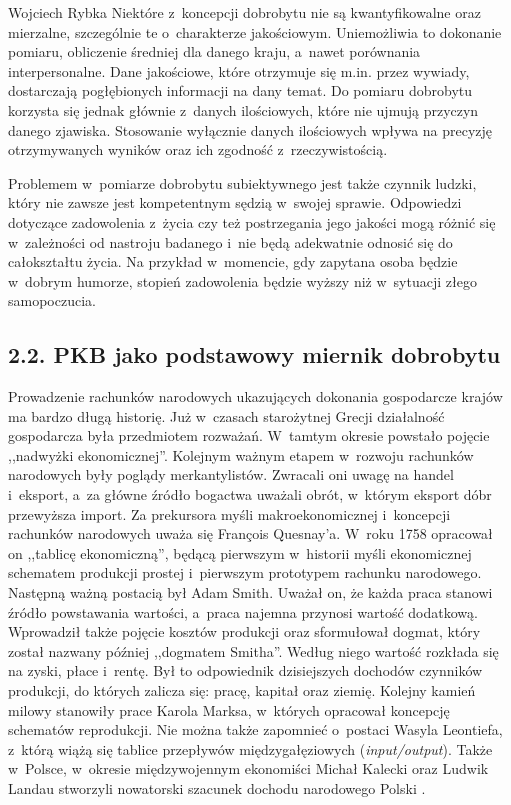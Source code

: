 \begin{artplenv}{Wojciech Rybka}
Niektóre z~koncepcji dobrobytu nie są kwantyfikowalne oraz mierzalne, szczególnie te o~charakterze jakościowym.
Uniemożliwia to dokonanie pomiaru, obliczenie średniej dla danego kraju, a~nawet porównania interpersonalne. Dane
jakościowe, które otrzymuje się m.in. przez wywiady, dostarczają pogłębionych informacji na dany temat. Do pomiaru
dobrobytu korzysta się jednak głównie z~danych ilościowych, które nie ujmują przyczyn danego zjawiska. Stosowanie
wyłącznie danych ilościowych wpływa na precyzję otrzymywanych wyników oraz ich zgodność z~rzeczywistością.

Problemem w~pomiarze dobrobytu subiektywnego jest także czynnik ludzki, który nie zawsze jest kompetentnym
sędzią w~swojej sprawie. Odpowiedzi dotyczące zadowolenia z~życia czy też postrzegania
jego jakości mogą różnić się w~zależności
od nastroju badanego i~nie będą adekwatnie odnosić się do całokształtu życia. Na przykład w~momencie, gdy zapytana
osoba będzie w~dobrym humorze, stopień zadowolenia będzie wyższy niż w~sytuacji złego samopoczucia. 

\subsection{2.2. PKB jako podstawowy miernik dobrobytu}
Prowadzenie rachunków narodowych ukazujących dokonania gospodarcze krajów ma bardzo długą historię. Już w~czasach
starożytnej Grecji działalność gospodarcza była przedmiotem rozważań. W~tamtym okresie powstało pojęcie ,,nadwyżki
ekonomicznej''. Kolejnym ważnym etapem w~rozwoju rachunków narodowych były poglądy merkantylistów. Zwracali oni uwagę na
handel i~eksport, a~za główne źródło bogactwa uważali obrót, w~którym eksport dóbr przewyższa import. Za prekursora
myśli makroekonomicznej i~koncepcji rachunków narodowych uważa się François Quesnay'a. W~roku 1758 opracował on
,,tablicę ekonomiczną'', będącą pierwszym w~historii myśli ekonomicznej schematem produkcji prostej i~pierwszym
prototypem rachunku narodowego. Następną ważną postacią był Adam Smith. Uważał on, że każda praca stanowi źródło
powstawania wartości, a~praca najemna przynosi wartość dodatkową. Wprowadził także pojęcie kosztów produkcji oraz
sformułował dogmat, który został nazwany później ,,dogmatem Smitha''. Według niego wartość rozkłada się na zyski, płace
i~rentę. Był to odpowiednik dzisiejszych dochodów czynników produkcji, do których zalicza się: pracę, kapitał oraz
ziemię. Kolejny kamień milowy stanowiły prace Karola Marksa, w~których opracował koncepcję schematów reprodukcji. Nie
można także zapomnieć o~postaci Wasyla Leontiefa, z~którą wiążą się tablice przepływów międzygałęziowych
(\textit{input/output}). Także w~Polsce, w~okresie międzywojennym ekonomiści Michał Kalecki oraz Ludwik Landau
stworzyli nowatorski szacunek dochodu narodowego Polski
\parencite{zienkowski_co_2001}.


\end{artplenv}
